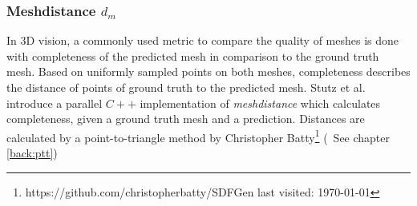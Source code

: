     \subsubsection*{Meshdistance $d_m$}    
    In 3D vision, a commonly used metric to compare the quality of meshes is done with completeness of the
    predicted mesh in comparison to the ground truth mesh. Based on uniformly sampled points on both meshes, completeness describes the distance of points of
    ground truth to the predicted mesh. 
    Stutz et al. \cite{Stutz2017, Stutz2018CVPR} introduce a parallel $C++$ implementation of \emph{meshdistance} which
    calculates completeness, given a ground truth mesh and a prediction. Distances are calculated by a
    point-to-triangle method by Christopher Batty\footnote{https://github.com/christopherbatty/SDFGen last visited: \today} (~See chapter \ref{back:ptt})
